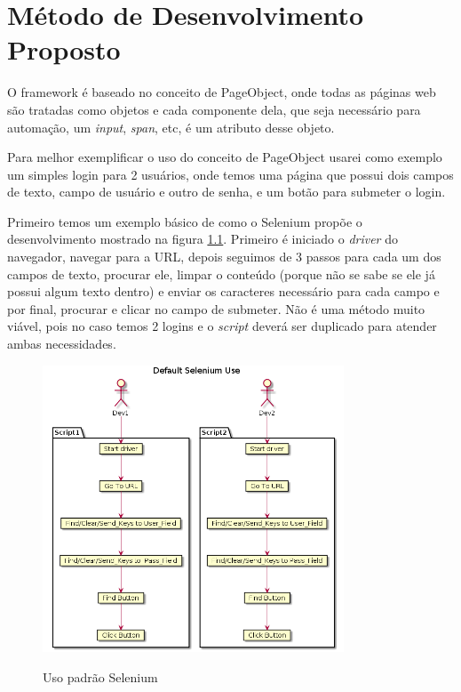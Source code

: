 %
%

\chapter{Método de Desenvolvimento Proposto}

    O framework é baseado no conceito de PageObject, onde todas as páginas web são tratadas como objetos
    e cada componente dela, que seja necessário para automação, um \emph{input}, \emph{span}, etc, é um
    atributo desse objeto.

    Para melhor exemplificar o uso do conceito de PageObject usarei como exemplo um simples login para 2
    usuários, onde temos uma página que possui dois campos de texto, campo de usuário e outro de senha,
    e um botão para submeter o login.

    Primeiro temos um exemplo básico de como o Selenium propõe o desenvolvimento mostrado na figura
    \ref{fig:selenium_default}. Primeiro é iniciado o \emph{driver} do navegador, navegar para a URL, depois
    seguimos de 3 passos para cada um dos campos de texto, procurar ele, limpar o conteúdo
    (porque não se sabe se ele já possui algum texto dentro) e enviar os caracteres necessário para
    cada campo e por final, procurar e clicar no campo de submeter. Não é uma método muito viável, pois
    no caso temos 2 logins e o \emph{script} deverá ser duplicado para atender ambas necessidades.

    \begin{figure}[H]
        \vspace*{0,3cm}
        \centering
        \caption{Uso padrão Selenium}
        \includegraphics[width=0.8\textwidth]{./04-figuras/page_object_selenium}
        \label{fig:selenium_default}
    \end{figure}

